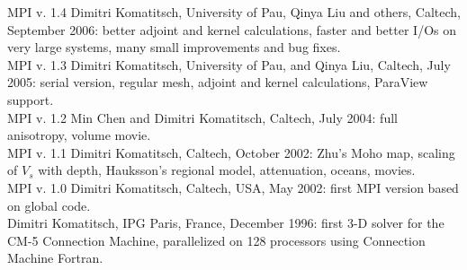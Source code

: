MPI v. 1.4 Dimitri Komatitsch, University of Pau, Qinya Liu and others,
Caltech, September 2006: better adjoint and kernel calculations, faster
and better I/Os on very large systems, many small improvements and
bug fixes.\\


MPI v. 1.3 Dimitri Komatitsch, University of Pau, and Qinya Liu, Caltech,
July 2005: serial version, regular mesh, adjoint and kernel calculations,
ParaView support.\\


MPI v. 1.2 Min Chen and Dimitri Komatitsch, Caltech, July 2004: full
anisotropy, volume movie.\\


MPI v. 1.1 Dimitri Komatitsch, Caltech, October 2002: Zhu's Moho map,
scaling of $V_{s}$ with depth, Hauksson's regional model, attenuation,
oceans, movies.\\


MPI v. 1.0 Dimitri Komatitsch, Caltech, USA, May 2002: first MPI version
based on global code.\\


Dimitri Komatitsch, IPG Paris, France, December 1996: first 3-D solver
for the CM-5 Connection Machine, parallelized on 128 processors using
Connection Machine Fortran.\\

